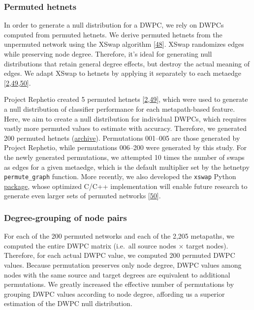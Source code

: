 \hypertarget{permuted-hetnets}{%
\subsubsection{Permuted hetnets}\label{permuted-hetnets}}

In order to generate a null distribution for a DWPC, we rely on DWPCs computed from permuted hetnets.
We derive permuted hetnets from the unpermuted network using the XSwap algorithm {[}\protect\hyperlink{ref-iKOIEzQ9}{48}{]}.
XSwap randomizes edges while preserving node degree.
Therefore, it's ideal for generating null distributions that retain general degree effects,
but destroy the actual meaning of edges.
We adapt XSwap to hetnets by applying it separately to each metaedge {[}\protect\hyperlink{ref-O21tn8vf}{2},\protect\hyperlink{ref-GE6jhWnt}{49},\protect\hyperlink{ref-17QDcGqUi}{50}{]}.

Project Rephetio created 5 permuted hetnets {[}\protect\hyperlink{ref-O21tn8vf}{2},\protect\hyperlink{ref-GE6jhWnt}{49}{]},
which were used to generate a null distribution of classifier performance for each metapath-based feature.
Here, we aim to create a null distribution for individual DWPCs, which requires vastly more permuted values to estimate with accuracy.
Therefore, we generated 200 permuted hetnets (\href{https://github.com/hetio/hetionet/tree/a95ae76581af604e91d744680aee3f888fa18887/hetnet/permuted/matrix}{archive}).
Permutations 001--005 are those generated by Project Rephetio,
while permutations 006--200 were generated by this study.
For the newly generated permutations, we attempted 10 times the number of swaps as edges for a given metaedge,
which is the default multiplier set by the hetnetpy \texttt{permute\_graph} function.
More recently, we also developed the \texttt{xswap} Python \href{https://github.com/greenelab/xswap}{package}, whose optimized C/C++ implementation will enable future research to generate even larger sets of permuted networks {[}\protect\hyperlink{ref-17QDcGqUi}{50}{]}.

\hypertarget{degree-grouping-of-node-pairs}{%
\subsubsection{Degree-grouping of node pairs}\label{degree-grouping-of-node-pairs}}

For each of the 200 permuted networks and each of the 2,205 metapaths, we computed the entire DWPC matrix (i.e.~all source nodes × target nodes).
Therefore, for each actual DWPC value, we computed 200 permuted DWPC values.
Because permutation preserves only node degree, DWPC values among nodes with the same source and target degrees are equivalent to additional permutations.
We greatly increased the effective number of permutations by grouping DWPC values according to node degree, affording us a superior estimation of the DWPC null distribution.

